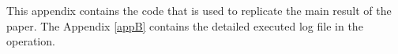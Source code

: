 \documentclass[12pt]{jfm}
\begin{document}




\newpage







\newpage


\appendix

\section{}\label{appA}

This appendix contains the code that is used to replicate the main result of the paper. The Appendix \ref{appB} contains the detailed executed log file in the operation.
\end{document}
